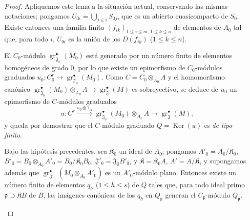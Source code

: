 \begin{proof}
Apliquemos este lema a la situación actual, conservando las mismas notaciones; pongamos $U_{0i}=\bigcup_{j\leq i}S_{0j}$, que es un abierto cuasicompacto de $S_0$. Existe entonces una familia finita $(f_{ik})_{1\leq i\leq m,\,1\leq k\leq n}$ de elementos de $A_0$ tal que, para todo $i$, $U_{0i}$ es la unión de los $D(f_{ik})$ ($1\leq k\leq n$).


El $C_0$-módulo $\operatorname{gr}_{\mathfrak J_0}^\bullet(M_0)$ está generado por un número finito de elementos homogéneos de grado 0, por lo que existe un epimorfismo de $C_0$-módulos graduados
$u_0:C_0^r\longrightarrow\operatorname{gr}_{\mathfrak J_0}^\bullet(M_0)$.
Como $C=C_0\otimes_{A_0}A$ y el homomorfismo canónico $\operatorname{gr}_{\mathfrak J_0}^\bullet(M_0)\otimes_{A_0}A
\to\operatorname{gr}_{\mathfrak J}^\bullet(M)$ es sobreyectivo, se deduce de $u_0$ un epimorfismo de $C$-módulos graduados
\[
u:C^r\xrightarrow{u_0\otimes1_A}
\operatorname{gr}_{\mathfrak J_0}^\bullet(M_0)\otimes_{A_0}A
\longrightarrow\operatorname{gr}_{\mathfrak J}^\bullet(M),
\]
y queda por demostrar que el $C$-módulo graduado
$Q=\operatorname{Ker}(u)$ es \emph{de tipo finito}.
\\[0.4\baselineskip]
\begin{lemma}[11.2.9.6]
\label{IV.11.2.9.6}
Bajo las hipótesis precedentes, sea $\mathfrak K_0$ un ideal de $A_0$; pongamos
$A'_0=A_0/\mathfrak K_0$, $B'_0=B_0\otimes_{A_0}A'_0=B_0/\mathfrak K_0B_0$,
$\mathfrak J'_0=\mathfrak J_0B'_0$,
y $\mathfrak K=\mathfrak K_0A$, $A'=A/\mathfrak K$, y supongamos además que
$\operatorname{gr}_{\mathfrak J'_0}^\bullet(M_0\otimes_{A_0}A'_0)$
es un $A'_0$-módulo plano. Entonces existe un número finito de elementos $q_h$ \textup{(}$1\leq h\leq s$\textup{)} de $Q$ tales que, para todo ideal primo $\mathfrak p\supset\mathfrak KB$ de $B$, las imágenes canónicas de los $q_h$ en $Q_\mathfrak p$ generan el $C_\mathfrak p$-módulo $Q_\mathfrak p$.
\end{lemma}


\end{proof}
